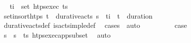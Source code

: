 \begin{isabellebody}
\ \isamarkupfalse%
\ {\isachardoublequoteopen}t\isactrlsub i\ {\isasymin}\ set\ {\isacharparenleft}{\kern0pt}htps{\isacharunderscore}{\kern0pt}exec\ {\isacharparenleft}{\kern0pt}{\isacharparenleft}{\kern0pt}t\isactrlsub {\isasympi}{\isacharcomma}{\kern0pt}{\isasympi}{\isacharprime}{\kern0pt}{\isacharparenright}{\kern0pt}{\isacharhash}{\kern0pt}{\isasympi}s\isanewline
\ \ \ \ \ \ \ \ \isamarkupfalse%
\ set{\isacharunderscore}{\kern0pt}insort{\isacharunderscore}{\kern0pt}htps\ {\isacartoucheopen}{\isacharparenleft}{\kern0pt}t\isactrlsub {\isasympi}{\isacharcomma}{\kern0pt}{\isasympi}{\isacharprime}{\kern0pt}{\isacharparenright}{\kern0pt}\ {\isasymin}\ durative{\isacharunderscore}{\kern0pt}acts\ {\isacharparenleft}{\kern0pt}{\isasympi}{\isacharhash}{\kern0pt}{\isasympi}s{\isacharparenright}{\kern0pt}\ {\isasymand}\ t\isactrlsub i\ {\isacharequal}{\kern0pt}\ t\isactrlsub {\isasympi}\ {\isacharplus}{\kern0pt}\ {\isacharparenleft}{\kern0pt}duration\ {\isasympi}{\isacharprime}{\kern0pt}{\isacharparenright}{\kern0pt}{\isacartoucheclose}\isanewline
\ \ \ \ \ \ \ \ \isamarkupfalse%
\ durative{\isacharunderscore}{\kern0pt}acts{\isacharunderscore}{\kern0pt}def\ is{\isacharunderscore}{\kern0pt}act{\isacharunderscore}{\kern0pt}simple{\isacharunderscore}{\kern0pt}def\ \isamarkupfalse%
\ {\isacharparenleft}{\kern0pt}cases\ {\isasympi}{\isacharprime}{\kern0pt}{\isacharparenright}{\kern0pt}\ auto\isanewline
\ \ \ \ \ \ \isamarkupfalse%
\ \isamarkupfalse%
\ {\isacharquery}{\kern0pt}case\isanewline
\ \ \ \ \ \ \ \ \isamarkupfalse%
\ {\isacartoucheopen}{\isacharparenleft}{\kern0pt}{\isasympi}{\isacharhash}{\kern0pt}{\isasympi}s{\isacharparenright}{\kern0pt}\ {\isacharequal}{\kern0pt}\ {\isasympi}s\ {\isacharat}{\kern0pt}\ {\isacharparenleft}{\kern0pt}{\isacharparenleft}{\kern0pt}t\isactrlsub {\isasympi}{\isacharcomma}{\kern0pt}{\isasympi}{\isacharprime}{\kern0pt}{\isacharparenright}{\kern0pt}{\isacharhash}{\kern0pt}{\isasympi}s\ htps{\isacharunderscore}{\kern0pt}exec{\isacharunderscore}{\kern0pt}app{\isacharunderscore}{\kern0pt}subset\ \isamarkupfalse%
\ auto\isanewline
\ \ \ \ \isamarkupfalse%
\isanewline
\ \ \isamarkupfalse%
%
\endisatagproof
{\isafoldproof}%
%
\isadelimproof

\end{isabellebody}
